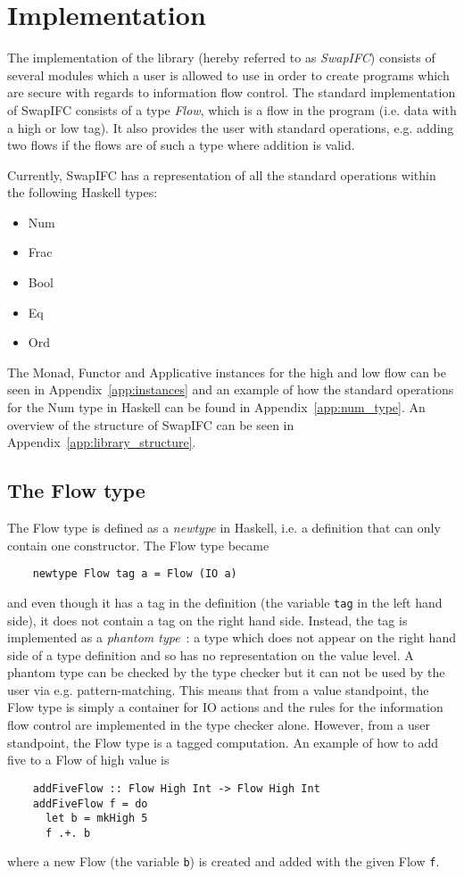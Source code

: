 \chapter{Implementation}
\label{chapter:implementation}
The implementation of the library (hereby referred to as \emph{SwapIFC}) consists of several modules which a user is allowed to use in order to create programs which are secure with regards to information flow control. The standard implementation of SwapIFC consists of a type \emph{Flow}, which is a flow in the program (i.e. data with a high or low tag). It also provides the user with standard operations, e.g. adding two flows if the flows are of such a type where addition is valid.

Currently, SwapIFC has a representation of all the standard operations within the following Haskell types:
\begin{itemize}
  \item Num
  \item Frac
  \item Bool
  \item Eq
  \item Ord
\end{itemize}

The Monad, Functor and Applicative instances for the high and low flow can be seen in Appendix~\ref{app:instances} and an example of how the standard operations for the Num type in Haskell can be found in Appendix~\ref{app:num_type}. An overview of the structure of SwapIFC can be seen in Appendix~\ref{app:library_structure}.
\section{The Flow type}
\label{sec:flow}
The Flow type is defined as a \emph{newtype} in Haskell, i.e. a definition that can only contain one constructor. The Flow type became
\begin{verbatim}
    newtype Flow tag a = Flow (IO a)
\end{verbatim}
and even though it has a tag in the definition (the variable {\tt tag} in the left hand side), it does not contain a tag on the right hand side. Instead, the tag is implemented as a \emph{phantom type}~\cite{haskell_phantom}: a type which does not appear on the right hand side of a type definition and so has no representation on the value level. A phantom type can be checked by the type checker but it can not be used by the user via e.g. pattern-matching. This means that from a value standpoint, the Flow type is simply a container for IO actions and the rules for the information flow control are implemented in the type checker alone. However, from a user standpoint, the Flow type is a tagged computation. An example of how to add five to a Flow of high value is
\begin{verbatim}
    addFiveFlow :: Flow High Int -> Flow High Int
    addFiveFlow f = do
      let b = mkHigh 5
      f .+. b
\end{verbatim}
where a new Flow (the variable {\tt b}) is created and added with the given Flow {\tt f}.

